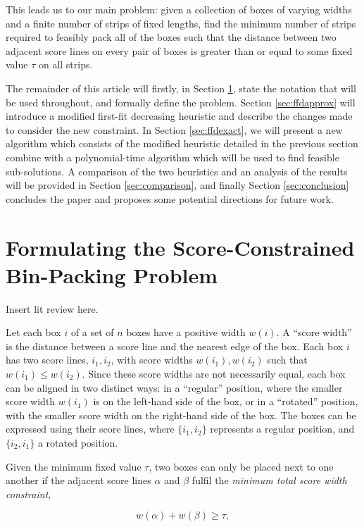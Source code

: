 \documentclass[oribibl]{llncs}
\begin{document}
This leads us to our main problem: given a collection of boxes of varying widths and a finite number of strips of fixed lengths, find the minimum number of strips required to feasibly pack all of the boxes such that the distance between two adjacent score lines on every pair of boxes is greater than or equal to some fixed value $\tau$ on all strips.

The remainder of this article will firstly, in Section \ref{sec:scbpp}, state the notation that will be used throughout, and formally define the problem. Section \ref{sec:ffdapprox} will introduce a modified first-fit decreasing heuristic and describe the changes made to consider the new constraint. In Section \ref{sec:ffdexact}, we will present a new algorithm which consists of the modified heuristic detailed in the previous section combine with a polynomial-time algorithm which will be used to find feasible sub-solutions. A comparison of the two heuristics and an analysis of the results will be provided in Section \ref{sec:comparison}, and finally Section \ref{sec:conclusion} concludes the paper and proposes some potential directions for future work.

\section{Formulating the Score-Constrained Bin-Packing Problem}
\label{sec:scbpp}
Insert lit review here.

Let each box $i$ of a set of $n$ boxes have a positive width $w(i)$. A ``score width'' is the distance between a score line and the nearest edge of the box. Each box $i$ has two score lines, $i_1, i_2$, with score widths $w(i_1), w(i_2)$ such that $w(i_1) \leq w(i_2)$. Since these score widths are not necessarily equal, each box can be aligned in two distinct ways: in a ``regular'' position, where the smaller score width $w(i_1)$ is on the left-hand side of the box, or in a ``rotated'' position, with the smaller score width on the right-hand side of the box. The boxes can be expressed using their score lines, where $\{i_1, i_2\}$ represents a regular position, and $\{i_2, i_1\}$ a rotated position. 

Given the minimum fixed value $\tau$, two boxes can only be placed next to one another if the adjacent score lines $\alpha$ and $\beta$ fulfil the \textit{minimum total score width constraint},

\begin{equation*}
	\label{eqn:mtswc}
	w(\alpha) + w(\beta) \geq \tau,
\end{equation*}
\end{document}
